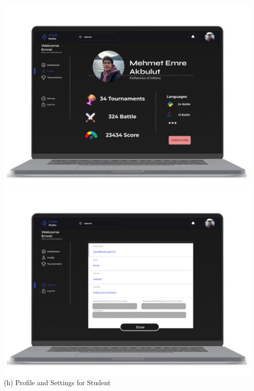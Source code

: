 \begin{center}
\includegraphics[scale=0.13]{Images/ui-ux/student_profile_settings/student_profile.png}
\includegraphics[scale=0.13]{Images/ui-ux/student_profile_settings/student_settings.png}
        (h) Profile and Settings for Student
\end{center}
\newpage
